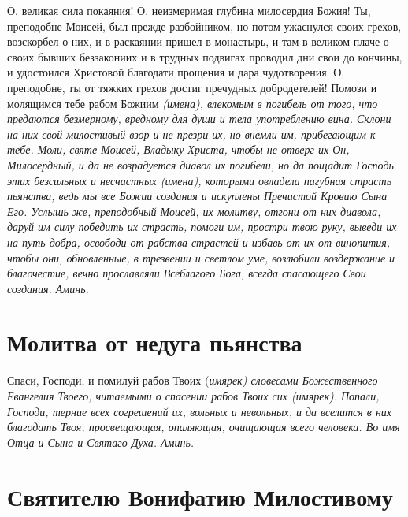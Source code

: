 О, великая сила покаяния! О, неизмеримая глубина милосердия Божия! Ты, преподобне Моисей, был прежде разбойником, но потом ужаснулся своих грехов, возскорбел о них, и в раскаянии пришел в монастырь, и там в великом плаче о своих бывших беззакониих и в трудных подвигах проводил дни свои до кончины, и удостоился Христовой благодати прощения и дара чудотворения. О, преподобне, ты от тяжких грехов достиг пречудных добродетелей! Помози и молящимся тебе рабом Божиим \itshape (имена),\normalfont{} влекомым в погибель от того, что предаются безмерному, вредному для души и тела употреблению вина. Склони на них свой милостивый взор и не презри их, но внемли им, прибегающим к тебе. Моли, святе Моисей, Владыку Христа, чтобы не отверг их Он, Милосердный, и да не возрадуется диавол их погибели, но да пощадит Господь этих безсильных и несчастных \itshape (имена),\normalfont{} которыми овладела пагубная страсть пьянства, ведь мы все Божии создания и искуплены Пречистой Кровию Сына Его. Услышь же, преподобный Моисей, их молитву, отгони от них диавола, даруй им силу победить их страсть, помоги им, простри твою руку, выведи их на путь добра, освободи от рабства страстей и избавь от их от винопития, чтобы они, обновленные, в трезвении и светлом уме, возлюбили  воздержание и благочестие, вечно прославляли Всеблагого Бога, всегда спасающего Свои создания. Аминь.


\section{Молитва от недуга пьянства}
 




Спаси, Господи, и помилуй рабов Твоих (\itshape имярек\normalfont{}) словесами Божественного Евангелия Твоего, читаемыми о спасении рабов Твоих сих (\itshape имярек\normalfont{}). Попали, Господи, терние всех согрешений их, вольных и невольных, и да вселится в них благодать Твоя, просвещающая, опаляющая, очищающая всего человека. Во имя Отца и Сына и Святаго Духа. Аминь.


\section{Святителю Вонифатию Милостивому}
 




